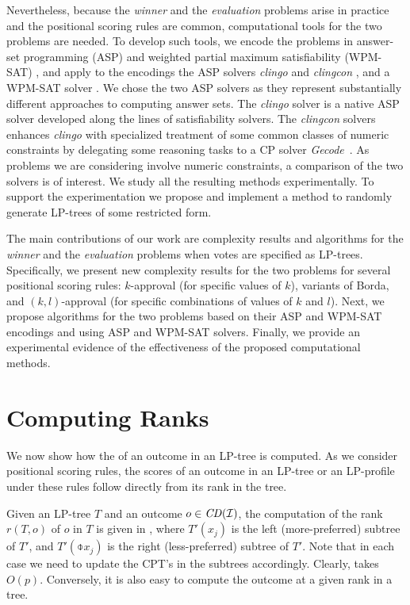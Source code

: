 Nevertheless, because the \emph{winner} and the \emph{evaluation}
problems arise in practice and the positional scoring rules
are common, computational tools for the two problems are needed. To 
develop such tools, we encode the problems in answer-set programming (ASP) 
\cite{mt99:stable,Niemela:1999} and weighted partial maximum satisfiability 
(WPM-SAT) \cite{ansotegui2010new,ansotegui2009solving}, and apply to the 
encodings the ASP solvers \emph{clingo} \cite{Gebser:clingo} and 
\emph{clingcon} \cite{Ostrowski:clingcon}, and a WPM-SAT solver \toulbar 
\cite{toulbar2}. We chose the two ASP solvers as they represent substantially
different approaches to computing answer sets. The \emph{clingo} solver is 
a native ASP solver developed along the lines of satisfiability solvers. 
The \emph{clingcon} solvers enhances \emph{clingo} with specialized 
treatment of some common classes of numeric constraints by delegating some 
reasoning tasks to a CP solver \emph{Gecode}~\cite{Schulte:gecode}. As 
problems we are considering involve numeric constraints, a comparison of 
the two solvers is of interest. We study all the resulting methods 
experimentally. To support the experimentation we propose and implement 
a method to randomly generate LP-trees of some restricted form.

The main contributions of our work are complexity results and algorithms 
for the \emph{winner} and the \emph{evaluation} problems when votes are 
specified as LP-trees. Specifically, we present new complexity results 
for the two problems for several positional scoring rules: $k$-approval 
(for specific values of $k$), variants of Borda, and $(k,l)$-approval 
(for specific combinations of values of $k$ and $l$). Next, we propose
algorithms for the two problems based on their ASP and WPM-SAT encodings 
and using ASP and WPM-SAT solvers. Finally, we provide an experimental 
evidence of the effectiveness of the proposed computational methods.


\section{Computing Ranks}
We now show how the  of an outcome in an LP-tree is computed.
As we consider positional scoring rules, the scores of an outcome
in an LP-tree or an LP-profile under these rules follow directly
from its rank in the tree.

Given an LP-tree $T$ and an outcome $o\in \mathit{CD}(\mathcal{I})$,
the computation of the rank $r(T,o)$ of $o$ in $T$
is given in , where $T'(x_j)$ is the 
left (more-preferred) subtree of $T'$, and
$T'(\obar{x_j})$ is the right (less-preferred)
subtree of $T'$. Note that in each case we need to
update the CPT's in the subtrees accordingly.
Clearly,  takes $O(p)$.
Conversely, it is also easy to compute the outcome
at a given rank in a tree.

